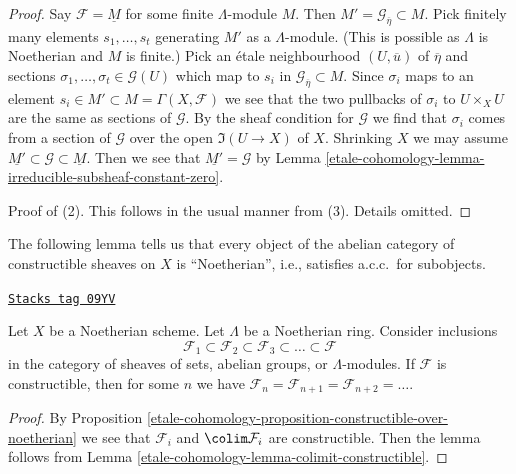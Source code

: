 \begin{proof}
\medskip\noindent
Say $\mathcal{F} = \underline{M}$ for some finite $\Lambda$-module $M$.
Then $M' = \mathcal{G}_{\overline{\eta}} \subset M$. Pick finitely
many elements $s_1, \ldots, s_t$ generating $M'$ as a $\Lambda$-module.
(This is possible as $\Lambda$ is Noetherian and $M$ is finite.)
Pick an \'etale neighbourhood $(U, \overline{u})$ of $\overline{\eta}$
and sections $\sigma_1, \ldots, \sigma_t \in \mathcal{G}(U)$ which map to
$s_i$ in $\mathcal{G}_{\overline{\eta}} \subset M$.
Since $\sigma_i$ maps to an element
$s_i \in M' \subset M = \Gamma(X, \mathcal{F})$
we see that the two pullbacks of $\sigma_i$ to $U \times_X U$
are the same as sections of $\mathcal{G}$. By the sheaf condition
for $\mathcal{G}$ we find that $\sigma_i$ comes from a section
of $\mathcal{G}$ over the open $\Im(U \to X)$ of $X$.
Shrinking $X$ we may assume
$\underline{M'} \subset \mathcal{G} \subset \underline{M}$.
Then we see that $\underline{M'} = \mathcal{G}$ by
Lemma \ref{etale-cohomology-lemma-irreducible-subsheaf-constant-zero}.

\medskip\noindent
Proof of (2). This follows in the usual manner from (3). Details
omitted.
\end{proof}

The following lemma tells us that every object of the abelian category of
constructible sheaves on $X$ is ``Noetherian'', i.e., satisfies
a.c.c.\ for subobjects.

\begin{lemma}
\label{etale-cohomology-lemma-constructible-over-noetherian-noetherian}
\href{https://stacks.math.columbia.edu/tag/09YV}{\texttt{Stacks tag 09YV}}

Let $X$ be a Noetherian scheme. Let $\Lambda$ be a Noetherian ring.
Consider inclusions
$$
\mathcal{F}_1 \subset \mathcal{F}_2 \subset \mathcal{F}_3 \subset \ldots
\subset \mathcal{F}
$$
in the category of sheaves of sets, abelian groups, or $\Lambda$-modules.
If $\mathcal{F}$ is constructible, then for some $n$
we have $\mathcal{F}_n = \mathcal{F}_{n + 1} = \mathcal{F}_{n + 2} = \ldots$.
\end{lemma}

\begin{proof}
By Proposition \ref{etale-cohomology-proposition-constructible-over-noetherian}
we see that $\mathcal{F}_i$ and $\colim \mathcal{F}_i$ are constructible.
Then the lemma follows from
Lemma \ref{etale-cohomology-lemma-colimit-constructible}.
\end{proof}

